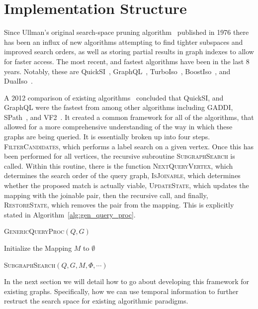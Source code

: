 \section{Implementation Structure}
\label{sec:structure}

Since Ullman's original search-space pruning algorithm~\cite{1976-ACMJ-Ullman}
published in 1976 there has been an influx of new algorithms attempting to find
tighter subspaces and improved search orders, as well as storing partial results
in graph indexes to allow for faster access.  The most recent, and fastest
algorithms have been in the last 8 years. Notably, these are
QuickSI~\cite{2008-VLDB-QuickSI}, GraphQL~\cite{2008-SIGMOD-GraphQL},
TurboIso~\cite{2013-SIGMOD-TurboISO}, BoostIso~\cite{2015-VLDB-BoostIso}, and
DualIso~\cite{2014-IEEE-DualIso}.

A 2012 comparison of existing algorithms~\cite{2012-VLDB-IsoSurvey} concluded
that QuickSI, and GraphQL were the fastest from among other algorithms including
GADDI, SPath~\cite{2010-VLDB-SPath}, and VF2~\cite{2004-PAMI-VF2}. It created a
common framework for all of the algorithms, that allowed for a more
comprehensive understanding of the way in which these graphs are being
queried. It is essentially broken up into four steps. \textsc{FilterCandidates},
which performs a label search on a given vertex.  Once this has been performed
for all vertices, the recursive subroutine \textsc{SubgraphSearch} is
called. Within this routine, there is the function \textsc{NextQueryVertex},
which determines the search order of the query graph, \textsc{IsJoinable}, which
determines whether the proposed match is actually viable, \textsc{UpdateState},
which updates the mapping with the joinable pair, then the recursive call, and
finally, \textsc{RestoreState}, which removes the pair from the mapping. This is
explicitly stated in Algorithm~\ref{alg:gen_query_proc}.

\begin{algorithm}
  \label{alg:gen_query_proc}
  \caption{\textsc{GenericQueryProc}$(Q,G)$}
  \SetAlgoLined

  Initialize the Mapping $M$ to $\emptyset$\;

  \textsc{SubgraphSearch}$(Q,G,M,\Phi, \cdots)$\;

  \setcounter{AlgoLine}{0}
\end{algorithm}

In the next section we will detail how to go about developing this framework for
existing graphs. Specifically, how we can use temporal information to further
restruct the search space for existing algorithmic paradigms.



